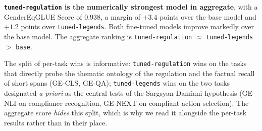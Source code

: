 \documentclass[pdflatex, sn-apa]{sn-jnl}%
\theoremstyle{thmstyleone}%
\theoremstyle{thmstyletwo}%
\theoremstyle{thmstylethree}%
\newcommand{\modelbase}{\texttt{base}}
\newcommand{\modellegends}{\texttt{tuned-legends}}
\newcommand{\modelreg}{\texttt{tuned-regulation}}
\begin{document}
\textbf{\modelreg{} is the numerically strongest model in aggregate}, with a
GenderEqGLUE Score of 0.938, a margin of $+3.4$ points over the base model and
$+1.2$ points over \modellegends. Both fine-tuned models improve markedly over
the base model. The aggregate ranking is \modelreg{} $\approx$ \modellegends{}
$>$ \modelbase.


The split of per-task wins is informative: \modelreg{} wins on the tasks that
directly probe the thematic ontology of the regulation and the factual recall of
short spans (GE-CLS, GE-QA); \modellegends{} wins on the two tasks designated
\emph{a priori} as the central tests of the Sargsyan-Damiani hypothesis (GE-NLI
on compliance recognition, GE-NEXT on compliant-action selection). The aggregate
score \emph{hides} this split, which is why we read it alongside the per-task
results rather than in their place.



\end{document}
